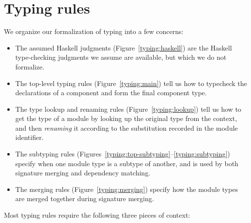 \section{Typing rules}

We organize our formalization of \Backpack{} typing into a few
concerns:

\begin{itemize}
    \item The assumed Haskell judgments (Figure~\ref{typing:haskell}) are the
        Haskell type-checking judgments we assume are available, but which
        we do not formalize.

    \item The top-level typing rules (Figure~\ref{typing:main}) tell us
        how to typecheck the declarations of a component and form the final
        component type.

    \item The type lookup and renaming rules (Figure~\ref{typing:lookup}) tell us how to
        get the type of a module by looking up the original type from
        the context, and then \emph{renaming} it according to the substitution
        recorded in the module identifier.

    \item The subtyping rules (Figures~\ref{typing:top-subtyping}--\ref{typing:subtyping})
        specify when one module type is a subtype of another, and is used
        by both signature merging and dependency matching.

    \item The merging rules (Figure~\ref{typing:merging}) specify how the
        module types are merged together during signature merging.

\end{itemize}
Most typing rules require the following three pieces of context:


